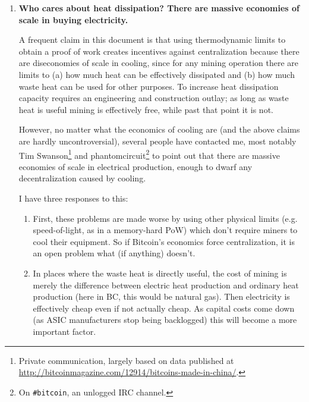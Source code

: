 \documentclass[letterpaper]{article}
\theoremstyle{xxx}
\theoremstyle{evil}
\theoremstyle{yyy}
\theoremstyle{plain}
\theoremstyle{zzz}
\begin{document}
\begin{enumerate}
\item \textbf{Who cares about heat dissipation? There are massive economies of scale
in buying electricity.}

A frequent claim in this document is that using thermodynamic limits to obtain
a proof of work creates incentives against centralization because there are
diseconomies of scale in cooling, since for any mining operation there are
limits to (a) how much heat can be effectively dissipated and (b) how much waste
heat can be used for other purposes. To increase heat dissipation capacity
requires an engineering and construction outlay; as long as waste heat is useful
mining is effectively free, while past that point it is not.

However, no matter what the economics of cooling are (and the above claims are
hardly uncontroversial), several people have contacted me, most notably Tim
Swanson\footnote{Private communication, largely based on data published at
\url{http://bitcoinmagazine.com/12914/bitcoins-made-in-china/}.}
and phantomcircuit\footnote{On \texttt{\#bitcoin}, an unlogged IRC channel.} to
point out that there are massive economies of scale in electrical production,
enough to dwarf any decentralization caused by cooling.

I have three responses to this:
\begin{enumerate}
\item First, these problems are made worse by using other physical limits (e.g.
speed-of-light, as in a memory-hard PoW) which don't require miners to cool
their equipment. So if Bitcoin's economics force centralization, it is an open
problem what (if anything) doesn't.

\item In places where the waste heat is directly useful, the cost of mining
is merely the difference between electric heat production and ordinary heat
production (here in BC, this would be natural gas). Then electricity is
effectively cheap even if not actually cheap.
As capital costs come down (as ASIC manufacturers stop being backlogged) this
will become a more important factor.


\end{enumerate}
\end{enumerate}
\end{document}
